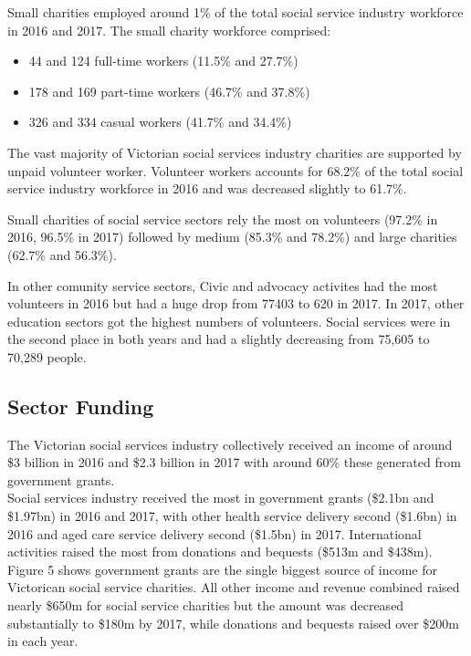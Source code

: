 \documentclass[
  11pt,
]{article}
\providecommand{\tightlist}{%
  \setlength{\itemsep}{0pt}\setlength{\parskip}{0pt}}
\begin{document}
Small charities employed around 1\% of the total social service industry workforce in 2016 and 2017. The small charity workforce comprised:

\begin{itemize}
\tightlist
\item
  44 and 124 full-time workers (11.5\% and 27.7\%)
\item
  178 and 169 part-time workers (46.7\% and 37.8\%)
\item
  326 and 334 casual workers (41.7\% and 34.4\%)
\end{itemize}

The vast majority of Victorian social services industry charities are supported by unpaid volunteer worker. Volunteer workers accounts for 68.2\% of the total social service industry workforce in 2016 and was decreased slightly to 61.7\%.

Small charities of social service sectors rely the most on volunteers (97.2\% in 2016, 96.5\% in 2017) followed by medium (85.3\% and 78.2\%) and large charities (62.7\% and 56.3\%).

In other comunity service sectors, Civic and advocacy activites had the most volunteers in 2016 but had a huge drop from 77403 to 620 in 2017. In 2017, other education sectors got the highest numbers of volunteers. Social services were in the second place in both years and had a slightly decreasing from 75,605 to 70,289 people.

\hypertarget{sector-funding}{%
\subsection{Sector Funding}\label{sector-funding}}

The Victorian social services industry collectively received an income of around \$3 billion in 2016 and
\$2.3 billion in 2017 with around 60\% these generated from government grants.\\
Social services industry received the most in government grants (\$2.1bn and \$1.97bn) in 2016 and 2017, with other health service delivery second (\$1.6bn) in 2016 and aged care service delivery second (\$1.5bn) in 2017. International activities raised the most from donations and bequests (\$513m and \$438m).\\
Figure 5 shows government grants are the single biggest source of income for Victorican social service charities. All other income and revenue combined raised nearly \$650m for social service charities but the amount was decreased substantially to \$180m by 2017, while donations and bequests raised over \$200m in each year.
\end{document}
